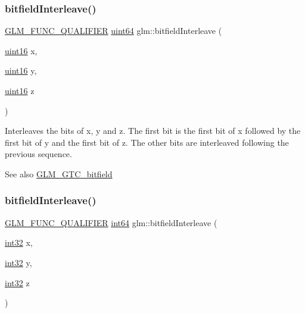 \subsubsection{\texorpdfstring{bitfield\+Interleave()}{bitfieldInterleave()}\hspace{0.1cm}{\footnotesize\ttfamily [10/16]}}
{\footnotesize\ttfamily \hyperlink{setup_8hpp_a33fdea6f91c5f834105f7415e2a64407}{G\+L\+M\+\_\+\+F\+U\+N\+C\+\_\+\+Q\+U\+A\+L\+I\+F\+I\+ER} \hyperlink{group__gtc__type__precision_gae3632bf9b37da66233d78930dd06378a}{uint64} glm\+::bitfield\+Interleave (\begin{DoxyParamCaption}\item[{\hyperlink{group__gtc__type__precision_gad8c2939e1fdd8e5828b31d95c52255d5}{uint16}}]{x,  }\item[{\hyperlink{group__gtc__type__precision_gad8c2939e1fdd8e5828b31d95c52255d5}{uint16}}]{y,  }\item[{\hyperlink{group__gtc__type__precision_gad8c2939e1fdd8e5828b31d95c52255d5}{uint16}}]{z }\end{DoxyParamCaption})}

Interleaves the bits of x, y and z. The first bit is the first bit of x followed by the first bit of y and the first bit of z. The other bits are interleaved following the previous sequence.

\begin{DoxySeeAlso}{See also}
\hyperlink{group__gtc__bitfield}{G\+L\+M\+\_\+\+G\+T\+C\+\_\+bitfield} 
\end{DoxySeeAlso}
\mbox{\label{group__gtc__bitfield_ga64e2d84f6560af3cc639644b1e628c42}} 
\subsubsection{\texorpdfstring{bitfield\+Interleave()}{bitfieldInterleave()}\hspace{0.1cm}{\footnotesize\ttfamily [11/16]}}
{\footnotesize\ttfamily \hyperlink{setup_8hpp_a33fdea6f91c5f834105f7415e2a64407}{G\+L\+M\+\_\+\+F\+U\+N\+C\+\_\+\+Q\+U\+A\+L\+I\+F\+I\+ER} \hyperlink{group__gtc__type__precision_ga435d75819cce297cc5fa21bd84ef89a5}{int64} glm\+::bitfield\+Interleave (\begin{DoxyParamCaption}\item[{\hyperlink{group__gtc__type__precision_ga632d8b25f6b61659f39ea4321fab92a4}{int32}}]{x,  }\item[{\hyperlink{group__gtc__type__precision_ga632d8b25f6b61659f39ea4321fab92a4}{int32}}]{y,  }\item[{\hyperlink{group__gtc__type__precision_ga632d8b25f6b61659f39ea4321fab92a4}{int32}}]{z }\end{DoxyParamCaption})}

